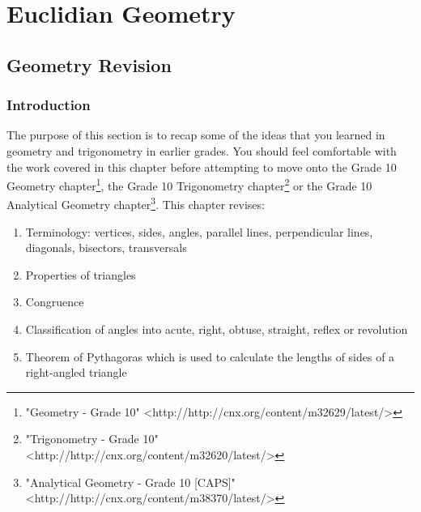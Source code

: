          \chapter{Euclidian Geometry}
    \setcounter{figure}{1}
    \setcounter{subfigure}{1}
    \label{84e7e983e7dc2060d6909eddb5375c22}
          \section{Geometry Revision}
    \setcounter{figure}{1}
    \setcounter{subfigure}{1}
    \label{8eb3a75df362978731c03bbeab266515}
%     
%     
%     
    \label{m39370*cid2}
            \subsection{ Introduction}
            \nopagebreak
      \label{m39370*id313235}The purpose of this section is to recap some of the ideas that you learned in geometry and trigonometry in earlier grades. You should feel comfortable with the work covered in this chapter before attempting to move onto the Grade 10 Geometry chapter\footnote{\raggedright{}"Geometry - Grade 10" <http://http://cnx.org/content/m32629/latest/>}, the Grade 10 Trigonometry chapter\footnote{\raggedright{}"Trigonometry - Grade 10" <http://http://cnx.org/content/m32620/latest/>} or the Grade 10 Analytical Geometry chapter\footnote{\raggedright{}"Analytical Geometry - Grade 10 [CAPS]" <http://http://cnx.org/content/m38370/latest/>}. This chapter revises:\par 
      \label{m39370*id313248}\begin{enumerate}[noitemsep, label=\textbf{\arabic*}. ] 
            \label{m39370*uid1}\item Terminology: vertices, sides, angles, parallel lines, perpendicular lines, diagonals, bisectors, transversals
\label{m39370*uid3}\item Properties of triangles
\label{m39370*uid4}\item Congruence
\label{m39370*uid5}\item Classification of angles into acute, right, obtuse, straight, reflex or revolution
\label{m39370*uid6}\item Theorem of Pythagoras which is used to calculate the lengths of sides of a right-angled triangle
\end{enumerate}
    \label{m39370*cid3}
